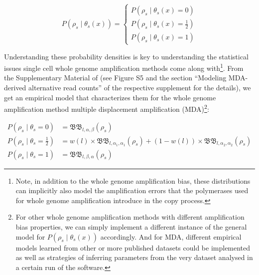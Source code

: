 \documentclass[authoryear,preprint,11pt]{scrartcl}
\newcommand{\Prob}{{P}}
\newcommand{\cB}{{\mathfrak B}}
\begin{document}
\begin{equation}
 \label{eq.rho-given-theta}
 \Prob(\rho_s \mid \theta_s(x) ) =
 \begin{cases}
  \Prob(\rho_s \mid \theta_s(x) = 0)        \\
  \Prob(\rho_s \mid \theta_s(x) = \frac12 ) \\
  \Prob(\rho_s \mid \theta_s(x) = 1 )
 \end{cases}
\end{equation}

Understanding these probability densities is key to understanding the statistical issues single cell whole genome amplification methods come along with\footnote{
 Note, in addition to the whole genome amplification bias, these distributions can implicitly also model the amplification errors that the polymerases used for whole genome amplification introduce in the copy process.
}.
From the Supplementary Material of \cite{lodato_somatic_2015} (see Figure S5 and the section ``Modeling MDA-derived alternative read counts'' of the respective supplement for the details), we get an empirical model that characterizes them for the whole genome amplification method multiple displacement amplification (MDA)\footnote{
 For other whole genome amplification methods with different amplification bias properties, we can simply implement a different instance of the general model for $\Prob(\rho_s \mid \theta_s(x))$ accordingly.
 And for MDA, different empirical models learned from other or more published datasets could be implemented as well as strategies of inferring parameters from the very dataset analysed in a certain run of the software.
}:

\begin{equation}
 \begin{split}
  \Prob(\rho_s \mid \theta_s = 0 ) 			&= \cB\cB_{l,\alpha, \beta}(\rho_s)\\
  \Prob(\rho_s \mid \theta_s = \frac12) &= w(l) \times \cB\cB_{l,\alpha_1,\alpha_1}(\rho_s) + (1-w(l)) \times \cB\cB_{l,\alpha_2,\alpha_2}(\rho_s)\\
  \Prob(\rho_s \mid \theta_s = 1 ) 			&= \cB\cB_{l,\beta,\alpha}(\rho_s)
 \end{split}
\end{equation}
\end{document}
